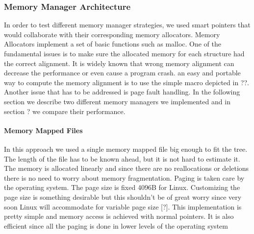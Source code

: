 \documentclass[12pt,letterpaper,doublespaced,ETD,dvips,proposal]{gtthesis}
\begin{document}
\begin{Body}
\subsubsection{Memory Manager Architecture} In order to test
different memory manager strategies, we used smart pointers that
would collaborate with their corresponding memory allocators. Memory
Allocators implement a set of basic functions such as malloc. One of
the fundamental issues is to make sure the allocated memory for each
structure had the correct alignment. It is widely known that wrong
memory alignment can decrease the performance or even cause a
program crash. an easy and portable way to compute the memory
alignment is to use the simple macro depicted in ??. Another issue
that has to be addressed is page fault handling. In the following
section we describe two different memory managers we implemented and
in section ? we compare their performance.

\paragraph{Memory Mapped Files} In this approach we used a single memory
mapped file big enough to fit the tree. The length of the file has
to be known ahead, but it is not hard to estimate it. The memory is
allocated linearly and since there are no reallocations or deletions
there is no need to worry about memory fragmentation. Paging is
taken care by the operating system. The page size is fixed 4096B for
Linux. Customizing the page size is something desirable but this
shouldn't be of great worry since very soon Linux will accommodate
for variable page size [?]. This implementation is pretty simple and
memory access is achieved with normal pointers. It is also efficient
since all the paging is done in lower levels of the operating system


\end{Body}
\end{document}
